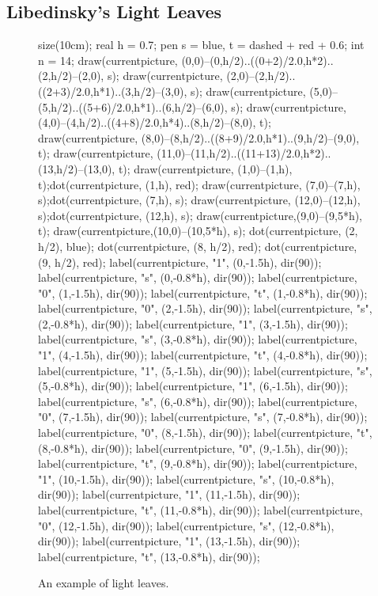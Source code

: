 \subsection{Libedinsky's Light Leaves}
\label{sec:prelim_lightleave}
\begin{figure}[ht]
	\centering
	\begin{asy}
	size(10cm);
	real h = 0.7;
	pen s = blue, t = dashed + red + 0.6;
	int n = 14;
	draw(currentpicture, (0,0)--(0,h/2)..((0+2)/2.0,h*2)..(2,h/2)--(2,0), s);
	draw(currentpicture, (2,0)--(2,h/2)..((2+3)/2.0,h*1)..(3,h/2)--(3,0), s);
	draw(currentpicture, (5,0)--(5,h/2)..((5+6)/2.0,h*1)..(6,h/2)--(6,0), s);
	draw(currentpicture, (4,0)--(4,h/2)..((4+8)/2.0,h*4)..(8,h/2)--(8,0), t);
	draw(currentpicture, (8,0)--(8,h/2)..((8+9)/2.0,h*1)..(9,h/2)--(9,0), t);
	draw(currentpicture, (11,0)--(11,h/2)..((11+13)/2.0,h*2)..(13,h/2)--(13,0), t);
	draw(currentpicture, (1,0)--(1,h), t);dot(currentpicture, (1,h), red);
	draw(currentpicture, (7,0)--(7,h), s);dot(currentpicture, (7,h), s);
	draw(currentpicture, (12,0)--(12,h), s);dot(currentpicture, (12,h), s);
	draw(currentpicture,(9,0)--(9,5*h), t);
	draw(currentpicture,(10,0)--(10,5*h), s);
	dot(currentpicture, (2, h/2), blue);
	dot(currentpicture, (8, h/2), red);
	dot(currentpicture, (9, h/2), red);
	label(currentpicture, "1", (0,-1.5h), dir(90));
	label(currentpicture, "s", (0,-0.8*h), dir(90));
	label(currentpicture, "0", (1,-1.5h), dir(90));
	label(currentpicture, "t", (1,-0.8*h), dir(90));
	label(currentpicture, "0", (2,-1.5h), dir(90));
	label(currentpicture, "s", (2,-0.8*h), dir(90));
	label(currentpicture, "1", (3,-1.5h), dir(90));
	label(currentpicture, "s", (3,-0.8*h), dir(90));
	label(currentpicture, "1", (4,-1.5h), dir(90));
	label(currentpicture, "t", (4,-0.8*h), dir(90));
	label(currentpicture, "1", (5,-1.5h), dir(90));
	label(currentpicture, "s", (5,-0.8*h), dir(90));
	label(currentpicture, "1", (6,-1.5h), dir(90));
	label(currentpicture, "s", (6,-0.8*h), dir(90));
	label(currentpicture, "0", (7,-1.5h), dir(90));
	label(currentpicture, "s", (7,-0.8*h), dir(90));
	label(currentpicture, "0", (8,-1.5h), dir(90));
	label(currentpicture, "t", (8,-0.8*h), dir(90));
	label(currentpicture, "0", (9,-1.5h), dir(90));
	label(currentpicture, "t", (9,-0.8*h), dir(90));
	label(currentpicture, "1", (10,-1.5h), dir(90));
	label(currentpicture, "s", (10,-0.8*h), dir(90));
	label(currentpicture, "1", (11,-1.5h), dir(90));
	label(currentpicture, "t", (11,-0.8*h), dir(90));
	label(currentpicture, "0", (12,-1.5h), dir(90));
	label(currentpicture, "s", (12,-0.8*h), dir(90));
	label(currentpicture, "1", (13,-1.5h), dir(90));
	label(currentpicture, "t", (13,-0.8*h), dir(90));
	\end{asy}
	\caption{An example of light leaves.}
	\label{fig:lightleaf_example}
\end{figure}

